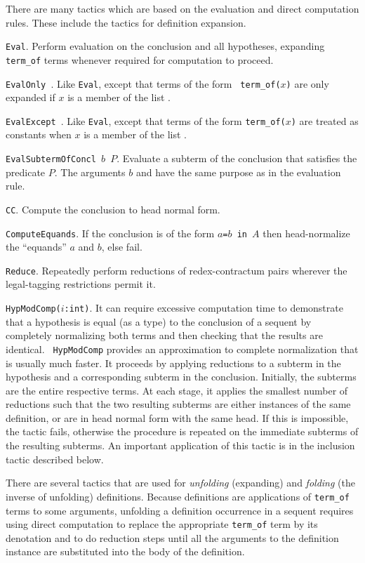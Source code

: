 \label{computation}

There are many tactics which are based on the evaluation and direct computation
rules.  These include the tactics for 
definition expansion.

{\tt Eval}.  Perform evaluation on the conclusion and all hypotheses, 
expanding {\tt term\_of} terms whenever required for computation to proceed.

{\tt EvalOnly {}}.  Like {\tt Eval}, except that terms of the form
{\tt
term\_\-of($x$)} are only expanded if $x$ is a member of the list .

{\tt EvalExcept {}}.  Like {\tt Eval}, except that terms of the
form {\tt term\_\-of($x$)} are treated as constants when $x$ is a member of the
list .

{\tt EvalSubtermOfConcl $b$  $P$}.  Evaluate a subterm of the
conclusion that satisfies the predicate $P$.  The arguments $b$ and 
have the same purpose as in the evaluation rule.

{\tt CC}.  Compute the conclusion to head normal form.

{\tt ComputeEquands}.  If the conclusion is of the form {\tt $a$=$b$~in~$A$}
then head-normalize the ``equands'' $a$ and $b$, else fail.

{\tt Reduce}.  Repeatedly perform reductions of redex-contractum
pairs wherever the legal-tagging restrictions permit it.

{\tt HypModComp($i$:int)}.  It can require excessive
computation time to demonstrate that a hypothesis
is equal (as a type) to the conclusion of a sequent
by completely normalizing both terms and then
checking that the results are identical.  {\tt
HypModComp} provides an approximation to complete
normalization that is usually much faster.  It
proceeds by applying reductions to a subterm in the
hypothesis and a corresponding subterm in the
conclusion.  Initially, the subterms are the entire
respective terms.  At each stage, it applies the
smallest number of reductions such that the two
resulting subterms are either instances of the same
definition, or are in head normal form with the
same head.  If this is impossible, the tactic
fails, otherwise the procedure is repeated on the
immediate subterms of the resulting subterms.  An
important application of this tactic is in the
inclusion tactic described below.

There are several tactics that are used for {\em unfolding} 
(expanding) and {\em folding} (the inverse of unfolding) definitions.  Because
definitions are applications of {\tt term\_of} terms to some arguments,
unfolding a definition occurrence in a sequent requires using direct computation
to replace the appropriate {\tt term\_of} term by its denotation and to do 
reduction steps until all the arguments to the definition instance are
substituted into the body of the definition.  

